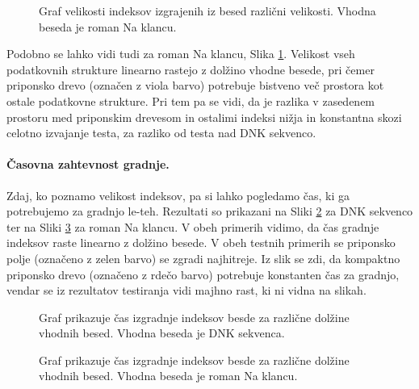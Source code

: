 \begin{figure}[tb]
    \centering
    
    \caption{Graf velikosti indeksov izgrajenih iz besed različni velikosti. Vhodna beseda je roman Na klancu.} 
    \label{fig:VelikostGrafSLO}
\end{figure}

Podobno se lahko vidi tudi za roman Na klancu, Slika \ref{fig:VelikostGrafSLO}. Velikost vseh podatkovnih strukture linearno rastejo z dolžino vhodne besede, pri čemer priponsko drevo (označen z viola barvo) potrebuje bistveno več prostora kot ostale podatkovne strukture. Pri tem pa se vidi, da je razlika v zasedenem prostoru med priponskim drevesom in ostalimi indeksi nižja in konstantna skozi celotno izvajanje testa, za razliko od testa nad DNK sekvenco.


\paragraph{Časovna zahtevnost gradnje.} 

Zdaj, ko poznamo velikost indeksov, pa si lahko pogledamo čas, ki ga potrebujemo za gradnjo le-teh. Rezultati so prikazani na Sliki \ref{fig:IzgradnjaGraf} za DNK sekvenco ter na Sliki \ref{fig:IzgradnjaGrafSLO} za roman Na klancu. V obeh primerih vidimo, da čas gradnje indeksov raste linearno z dolžino besede. V obeh testnih primerih se priponsko polje (označeno z zelen barvo) se zgradi najhitreje. Iz slik se zdi, da kompaktno priponsko drevo (označeno z rdečo barvo) potrebuje konstanten čas za gradnjo, vendar se iz rezultatov testiranja vidi majhno rast, ki ni vidna na slikah.

\begin{figure}[htb]
    \centering
    
    \caption{Graf prikazuje čas izgradnje indeksov besde za različne dolžine vhodnih besed. Vhodna beseda je DNK sekvenca.} 
    \label{fig:IzgradnjaGraf}
\end{figure}

\begin{figure}[htb]
    \centering
    
    \caption{Graf prikazuje čas izgradnje indeksov besde za različne dolžine vhodnih besed. Vhodna beseda je roman Na klancu.} 
    \label{fig:IzgradnjaGrafSLO}
\end{figure}

